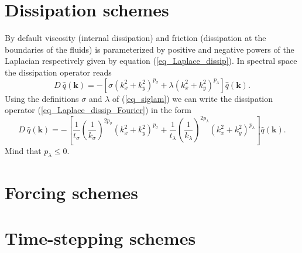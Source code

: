 \section{Dissipation schemes} 
\label{ssec_Dschemes}
By default viscosity (internal dissipation) and friction
(dissipation at the boundaries of the fluids) is parameterized 
by positive and negative powers of the Laplacian respectively given
by equation (\ref{eq_Laplace_dissip}). In spectral space the dissipation
operator reads
\begin{equation} \label{eq_Laplace_dissip_Fourier}
   D \ \hat{q}(\mathbf{k})
    = - \left[
         \sigma \left(k_{x}^{2} + k_{y}^{2} \right)^{p_{\sigma}}
            + 
         \lambda \left(k_{x}^{2} + k_{y}^{2} \right)^{p_{\lambda}}
        \right]
        \hat{q}(\mathbf{k}).
\end{equation}
Using the definitions $\sigma$ and $\lambda$ of (\ref{eq_siglam})
we can write the dissipation operator (\ref{eq_Laplace_dissip_Fourier})
in the form
\begin{equation} \label{eq_Laplace_dissip_Fourier2}
   D \ \hat{q}(\mathbf{k})
    = - \left[
         \frac{1}{t_{\sigma}} 
         \left(\frac{1}{k_{\sigma}}\right)^{2 p_{\sigma}}  
         \left(k_{x}^{2} + k_{y}^{2} \right)^{p_{\sigma}}
          + 
         \frac{1}{t_{\lambda}} 
         \left(\frac{1}{k_{\lambda}}\right)^{2 p_{\lambda}}
         \left(k_{x}^{2} + k_{y}^{2} \right)^{p_{\lambda}}
        \right]
        \hat{q}(\mathbf{k}).
\end{equation}
Mind that $p_{\lambda} \le 0$. 


\section{Forcing schemes}
\label{ssec_Fschemes}



\section{Time-stepping schemes}
\label{ssec_Tschemes}
